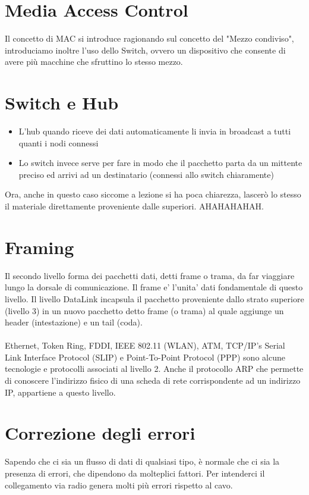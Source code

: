 \documentclass[12pt, a4paper, openany, twoside]{book}
\begin{document}
\section{Media Access Control}
Il concetto di MAC si introduce ragionando sul concetto del "Mezzo condiviso",
introduciamo inoltre l'uso dello Switch, ovvero un dispositivo che consente
di avere più macchine che sfruttino lo stesso mezzo. 
\section{Switch e Hub}
\begin{itemize}
	\item L'hub quando riceve dei dati automaticamente li invia in broadcast 
	a tutti quanti i nodi connessi
	\item Lo switch invece serve per fare in modo che il pacchetto parta da un
	mittente preciso ed arrivi ad un destinatario (connessi allo switch 
	chiaramente)
\end{itemize}
Ora, anche in questo caso siccome a lezione si ha poca chiarezza, lascerò
lo stesso il materiale direttamente proveniente dalle superiori.
AHAHAHAHAH.
\section{Framing}
Il secondo livello forma dei pacchetti dati, detti frame o trama, da far 
viaggiare lungo la dorsale di comunicazione. Il frame e' l'unita' dati 
fondamentale di questo livello. Il livello DataLink incapsula il pacchetto 
proveniente dallo strato superiore (livello 3) in un nuovo pacchetto detto
frame (o trama) al quale aggiunge un header (intestazione) e un tail (coda).\\ \\

Ethernet, Token Ring, FDDI, IEEE 802.11 (WLAN), ATM, TCP/IP's Serial Link 
Interface Protocol (SLIP) e Point-To-Point Protocol (PPP) sono alcune 
tecnologie e protocolli associati al livello 2. Anche il protocollo 
ARP che permette di conoscere l'indirizzo fisico di una scheda di rete 
corrispondente ad un indirizzo IP, appartiene a questo livello. 
\section{Correzione degli errori}
Sapendo che ci sia un flusso di dati di qualsiasi tipo, è normale che ci sia la
presenza di errori, che dipendono da molteplici fattori. Per intenderci 
il collegamento via radio genera molti più errori rispetto al cavo.
\end{document}
